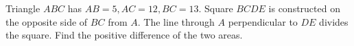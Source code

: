 Triangle $ABC$ has $AB=5,AC=12,BC=13$. Square $BCDE$ is constructed on the opposite side of $BC$ from $A$. The line through $A$ perpendicular to $DE$ divides the square. Find the positive difference of the two areas.

